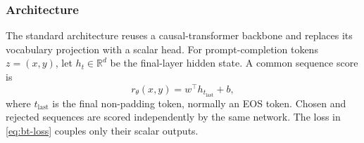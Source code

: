 \subsubsection{Architecture}

The standard architecture reuses a causal-transformer backbone and replaces
its vocabulary projection with a scalar head.  For prompt-completion tokens
$z=(x,y)$, let $h_t\in\mathbb{R}^d$ be the final-layer hidden state.  A common
sequence score is
\begin{equation}
    r_\theta(x,y)=w^\top h_{t_{\mathrm{last}}}+b,
\end{equation}
where $t_{\mathrm{last}}$ is the final non-padding token, normally an EOS
token.  Chosen and rejected sequences are scored independently by the same
network.  The loss in \eqref{eq:bt-loss} couples only their scalar outputs.

